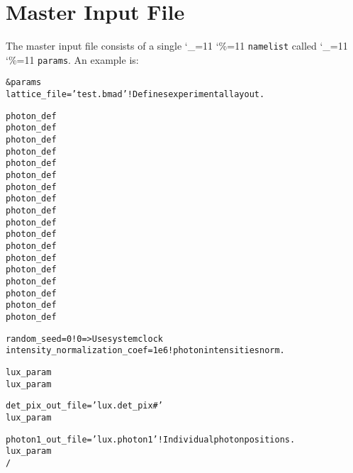 \documentclass[11pt]{article}
\newcommand\ttcmd{\begingroup\catcode`\_=11 \catcode`\%=11 \dottcmd}
\newcommand\dottcmd[1]{\texttt{#1}\endgroup}
\newcommand{\vn}{\ttcmd}
\newenvironment{example}
  {\vspace{\ExBeg} \begin{alltt}}
  {\end{alltt} \vspace{\ExEnd}}
\newlength{\ExBeg}
\newlength{\ExEnd}
\begin{document}
\section{Master Input File} 
\label{s:master.file}

The master input file consists of a single \vn{namelist} called \vn{params}.
An example is:
\begin{example}
  &params
    lattice_file = 'test.bmad'                     ! Defines experimental layout.

    photon_def%
    photon_def%
    photon_def%
    photon_def%
    photon_def%
    photon_def%
    photon_def%
    photon_def%
    photon_def%
    photon_def%
    photon_def%
    photon_def%
    photon_def%
    photon_def%
    photon_def%
    photon_def%
    photon_def%
    photon_def%

    random_seed = 0                                ! 0 => Use system clock
    intensity_normalization_coef = 1e6             ! photon intensities norm.

    lux_param%
    lux_param%

    det_pix_out_file = 'lux.det_pix#'
    lux_param%

    photon1_out_file = 'lux.photon1'               ! Individual photon positions.
    lux_param%
  /
\end{example}
\end{document}
